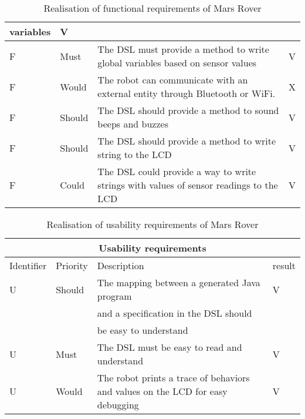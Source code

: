 \begin{table}[H]
\begin{tabular}{|l|l|l|l|}
			variables & V\\  \hline
		F\doTCC & Must & The DSL must provide a method to write global variables
			based on sensor values & V\\  \hline
		F\doTCC & Would & The robot can communicate with an external entity
			through Bluetooth or WiFi. & X \\  \hline
		F\doTCC & Should & The DSL should provide a method to sound beeps and
			buzzes & V \\  \hline
		F\doTCC & Should & The DSL should provide a method to write string to
			the LCD & V\\  \hline
		F\doTCC & Could & The DSL could provide a way to write strings with
			values of sensor readings to the LCD & V\\  
		\hline
	\end{tabular}
\caption{Realisation of functional requirements of Mars Rover}
\label{tbl:endFunctionalReq}
\end{table}

\begin{table}[H]
	\centering
	\begin{tabular}{|l|l|l|l|}
		\hline
		\multicolumn{4}{|c|}{Usability requirements} \\  \hline
		\hline
		Identifier & Priority & Description & result\\  
		\hline
		\hline
		U\doTCC & Should & The mapping between a generated Java program  & V\\  
				&		& and a specification in the DSL should & \\  
				& 		& be easy to understand & \\  \hline
		U\doTCC & Must & The DSL must be easy to read and understand & V \\  \hline
		U\doTCC & Would & The robot prints a trace of behaviors and values on
			the LCD for easy debugging & V\\  
		\hline
	\end{tabular}
\caption{Realisation of usability requirements of Mars Rover}
\label{tbl:endUsabilityReq}
\end{table}

